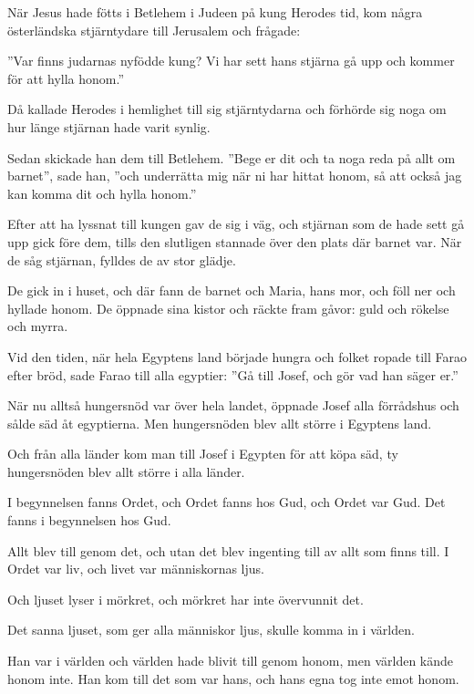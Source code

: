 {När Jesus hade fötts i Betlehem i Judeen på kung Herodes tid, kom några österländska stjärntydare till Jerusalem 
och frågade: }

''Var finns judarnas nyfödde kung? Vi har sett hans stjärna gå upp och kommer för att hylla honom.'' 

Då kallade Herodes i hemlighet till sig stjärntydarna och förhörde sig noga om hur länge stjärnan hade varit synlig. 

Sedan skickade han dem till Betlehem. ''Bege er dit och ta noga reda på allt om barnet'', sade han, ''och underrätta mig när ni har hittat honom, så att också jag kan komma dit och hylla honom.'' 

Efter att ha lyssnat till kungen gav de sig i väg, och stjärnan som de hade sett gå upp gick före dem, tills den slutligen stannade över den plats där barnet var. 
När de såg stjärnan, fylldes de av stor glädje. 

De gick in i huset, och där fann de barnet och Maria, hans mor, och föll ner och hyllade honom. De öppnade sina kistor och räckte fram gåvor: guld och rökelse och myrra.


{Vid den tiden, när hela Egyptens land började hungra och folket ropade till Farao efter bröd, sade Farao till alla egyptier:} ''Gå till Josef, och gör vad han säger er.'' 

När nu alltså hungersnöd var över hela landet, öppnade Josef alla förrådshus och sålde säd åt egyptierna. Men hungersnöden blev allt större i Egyptens land. 

Och från alla länder kom man till Josef i Egypten för att köpa säd, ty hungersnöden blev allt större i alla länder.

{I begynnelsen fanns Ordet, och Ordet fanns hos Gud, och Ordet var Gud. 
Det fanns i begynnelsen hos Gud. }

Allt blev till genom det, och utan det blev ingenting till av allt som finns till. 
I Ordet var liv, och livet var människornas ljus. 

Och ljuset lyser i mörkret, och mörkret har inte övervunnit det.

Det sanna ljuset, som ger alla människor ljus, skulle komma in i världen. 

Han var i världen och världen hade blivit till genom honom, men världen kände honom inte. 
Han kom till det som var hans, och hans egna tog inte emot honom. 

